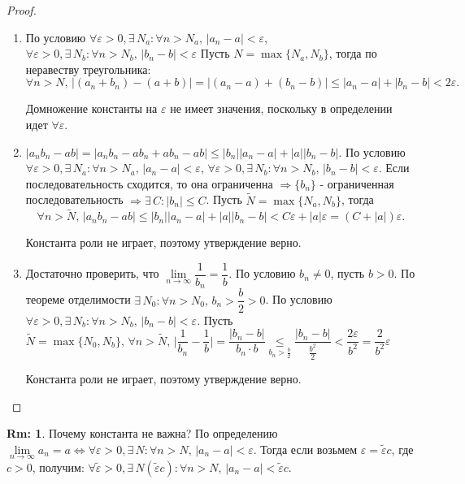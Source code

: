 \documentclass[12pt]{article}
\theoremstyle{definition}
\newtheorem{rem}{Rm:}
\begin{document}
\begin{proof}
	\begin{enumerate}[label={\arabic*)}]
		\item По условию $\forall \varepsilon > 0, \exists\, N_a\colon \forall n > N_a, \, |a_n - a| < \varepsilon$, $\forall \varepsilon > 0, \exists\, N_b\colon \forall n > N_b, \, |b_n - b| < \varepsilon$
		Пусть $N = \max \{N_a, N_b\}$, тогда по неравеству треугольника:
		$$\forall n > N, \, \big|(a_n + b_n) - (a + b) \big| = \big|(a_n - a) + (b_n - b) \big|\leq |a_n - a| + |b_n - b| < 2 \varepsilon.$$
		
		Домножение константы на $\varepsilon$ не имеет значения, поскольку в определении идет $\forall \varepsilon$.
		
		\item $|a_nb_n - ab| = | a_nb_n - ab_n + ab_n -ab| \leq |b_n||a_n - a| + |a||b_n - b|$. По условию $\forall \varepsilon > 0, \exists \, N_a\colon \forall n > N_a, \, |a_n - a| < \varepsilon$, $\forall \varepsilon > 0, \exists \, N_b\colon \forall n > N_b, \, |b_n - b| < \varepsilon$. Если последовательность сходится, то она ограниченна $\Rightarrow \{b_n\}$ - ограниченная последовательность $\Rightarrow \exists\, C\colon |b_n| \leq C$. Пусть $\tilde{N} = \max \{N_a, N_b\}$, тогда 
		$$\forall n > \tilde{N}, \, |a_nb_n - ab| \leq |b_n||a_n - a| + |a||b_n - b| < C\varepsilon + |a|\varepsilon = (C + |a|)\varepsilon.$$
		
		Константа роли не играет, поэтому утверждение верно.
		
		\item Достаточно проверить, что  $\lim\limits_{n \rightarrow \infty}\dfrac{1}{b_n} = \dfrac{1}{b}$. По условию $b_n \neq 0$, пусть $b > 0$. По теореме отделимости $\exists \, N_0\colon \forall n > N_0, \, b_n > \dfrac{b}{2} > 0$. По условию $\forall \varepsilon > 0, \exists\, N_b\colon \forall n > N_b, \, |b_n - b| < \varepsilon$. 
		Пусть $\tilde{N} = \max\{N_0, N_b\}, \, \forall n > \tilde{N}, \, \bigg|\dfrac{1}{b_n} - \dfrac{1}{b} \bigg| = \dfrac{|b_n - b|}{b_n\cdot b}\underset{b_n > \frac{b}{2}}{\leq} \dfrac{|b_n - b|}{\frac{b^2}{2}}< \dfrac{2 \varepsilon}{b^2} = \dfrac{2}{b^2}\varepsilon$	
		
		Константа роли не играет, поэтому утверждение верно.
	\end{enumerate}
\end{proof}

\begin{rem}
	Почему константа не важна? По определению $\lim\limits_{n \to \infty}a_n = a \Leftrightarrow \forall \varepsilon > 0, \exists \, N \colon \forall n > N, \, |a_n -a| < \varepsilon$. Тогда если возьмем $\varepsilon = \tilde{\varepsilon}{c}$, где $c>0$, получим: $ \forall \tilde{\varepsilon} > 0, \exists \, N(\tilde{\varepsilon}c) \colon \forall n > N, \, |a_n -a| < \tilde{\varepsilon}c$.
\end{rem}
\end{document}
